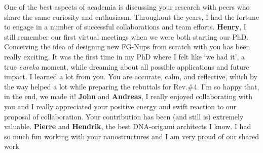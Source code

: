\noindent One of the best aspects of academia is discussing your research with peers who share the same curiosity and enthusiasm. Throughout the years, I had the fortune to engage in a number of successful collaborations and team efforts. \noindent \textbf{Henry}, I still remember our first virtual meetings when we were both starting our PhD. Conceiving the idea of designing new FG-Nups from scratch with you has been really exciting. It was the first time in my PhD where I felt like `we had it', a true \emph{eureka} moment, while dreaming about all possible applications and future impact. I learned a lot from you. You are accurate, calm, and reflective, which by the way helped a lot while preparing the rebuttals for Rev.\#4. I'm so happy that, in the end, we made it! \textbf{John} and \textbf{Andreas}, I really enjoyed collaborating with you and I really appreciated your positive energy and swift reaction to our proposal of collaboration. Your contribution has been (and still is) extremely valuable. \textbf{Pierre} and \textbf{Hendrik}, the best DNA-origami architects I know. I had so much fun working with your nanostructures and I am very proud of our shared work.\\[0.5pt]

